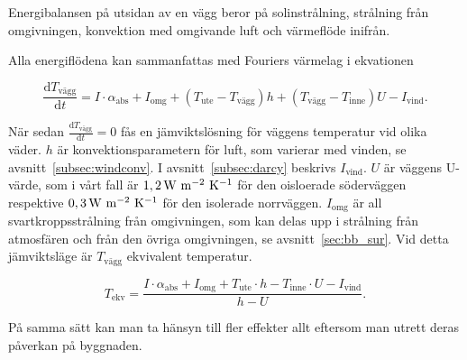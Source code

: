 Energibalansen på utsidan av en vägg beror på solinstrålning, strålning från omgivningen, konvektion med omgivande luft och värmeflöde inifrån.

Alla energiflödena kan sammanfattas med Fouriers värmelag i ekvationen 

\begin{equation}
\label{eq:walltemp}
\frac{\mathrm{d}T_\text{vägg}}{\mathrm{d}t} = 
I\cdot \alpha_\text{abs} + I_\text{omg} + (T_\text{ute} - T_\text{vägg}) h +( T_\text{vägg} - T_\text{inne} ) U - I_\text{vind}.
\end{equation}

När sedan $\frac{\mathrm{d}T_\text{vägg}}{\mathrm{d}t}=0$ fås en jämviktslösning för väggens temperatur vid olika väder. $h$ är konvektionsparametern för luft, som varierar med vinden, se avsnitt~\ref{subsec:windconv}. I avsnitt~\ref{subsec:darcy} beskrivs $I_\text{vind}$.
$U$ är väggens U-värde, som i vårt fall är $\unit[1,2]{W~m^{-2}~{K^{-1}}}$ för den oisloerade söderväggen respektive $\unit[0,3]{W~m^{-2}~K^{-1}}$ för den isolerade norrväggen. $I_\text{omg}$ är all svartkroppsstrålning från omgivningen, som kan delas upp i strålning från atmosfären och från den övriga omgivningen, se avsnitt~\ref{sec:bb_sur}. Vid detta jämviktsläge är $T_\text{vägg}$ ekvivalent temperatur.

\begin{equation}\boxed{ \; \; \;
\label{eq:ekvtemp}
T_\text{ekv} = 
\frac{I\cdot \alpha_\text{abs} + I_\text{omg} + T_\text{ute} \cdot h - T_\text{inne} \cdot U - I_\text{vind}}{h-U}.
\; \; \;}\end{equation}

På samma sätt kan man ta hänsyn till fler effekter allt eftersom man utrett deras påverkan på byggnaden.
